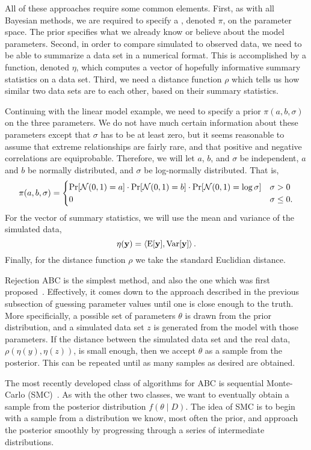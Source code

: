 All of these approaches require some common elements. First, as with all
Bayesian methods, we are required to specify a ,
denoted $\pi$, on the parameter space. The prior specifies what we already know
or believe about the model parameters. Second, in order to compare simulated to
observed data, we need to be able to summarize a data set in a numerical
format. This is accomplished by a function, denoted $\eta$, which computes a
vector of hopefully informative summary statistics on a data set. Third, we
need a distance function $\rho$ which tells us how similar two data sets are to
each other, based on their summary statistics.

Continuing with the linear model example, we need to specify a prior $\pi(a, b,
\sigma)$ on the three parameters. We do not have much certain information about
these parameters except that $\sigma$ has to be at least zero, but it seems
reasonable to assume that extreme relationships are fairly rare, and that
positive and negative correlations are equiprobable. Therefore, we will let
$a$, $b$, and $\sigma$ be independent, $a$ and $b$ be normally distributed,
and $\sigma$ be log-normally distributed. That is,
\[
  \pi(a, b, \sigma) = 
  \begin{cases}
    \Pr[\mathcal{N}(0, 1) = a] \cdot \Pr[\mathcal{N}(0, 1) = b] \cdot \Pr[\mathcal{N}(0, 1) = \log\sigma]
     & \sigma > 0 \\
    0 & \sigma \le 0.
  \end{cases}
\]
For the vector of summary statistics, we will use the mean and variance of the
simulated data,
\[
  \eta(\mathbf{y}) = \left<\operatorname{E}[\mathbf{y}], \operatorname{Var}[\mathbf{y}]\right>.
\]
Finally, for the distance function $\rho$ we take the standard Euclidian
distance.

Rejection ABC is the simplest method, and also the one which was first
proposed~\autocite{rubin1984bayesianly}. Effectively, it comes down to the
approach described in the previous subsection of guessing parameter values
until one is close enough to the truth. More specificially, a possible set of
parameters $\theta$ is drawn from the prior distribution, and a simulated data
set $z$ is generated from the model with those parameters. If the distance
between the simulated data set and the real data, $\rho(\eta(y), \eta(z))$, is
small enough, then we accept $\theta$ as a sample from the posterior. This can
be repeated until as many samples as desired are obtained.


The most recently developed class of algorithms for ABC is sequential
Monte-Carlo (SMC)~\autocite{sisson2007sequential}. As with the other two
classes, we want to eventually obtain a sample from the posterior distribution
$f(\theta \mid D)$. The idea of SMC is to begin with a sample from a
distribution we know, most often the prior, and approach the posterior smoothly
by progressing through a series of intermediate distributions.

